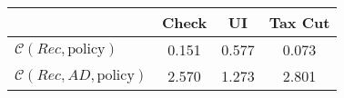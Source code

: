 \begin{tabular}{@{}lccc@{}} 
\toprule 
                          & Check      & UI    & Tax Cut    \\  \midrule 
$\mathcal{C}(Rec,\text{policy})$ & 0.151  & 0.577  & 0.073     \\ 
$\mathcal{C}(Rec, AD,\text{policy})$ & 2.570  & 1.273  & 2.801     \\ 
\end{tabular}  
